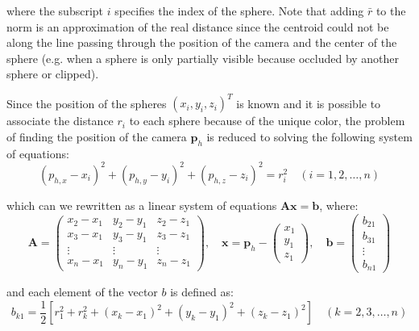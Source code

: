 \documentclass[a4paper]{article}
\begin{document}
\noindent where the subscript $i$ specifies the index of the
sphere. Note that adding $\bar{r}$ to the norm is an
approximation of the real distance since the centroid could
not be along the line passing through the position of the
camera and the center of the sphere (e.g. when a sphere is
only partially visible because occluded by another sphere or
clipped).

Since the position of the spheres $(x_i, y_i, z_i)^T$ is known
and it is possible
to associate the distance $r_i$ to each sphere because of the
unique color, the problem of finding the position of the
camera $\bm{p}_h$ is reduced to solving the following system of equations:
\begin{equation}
    (p_{h,x} - x_i)^2 + (p_{h,y} - y_i)^2 + (p_{h,z} - z_i)^2 = r_i^2 \quad (i = 1, 2, \dots, n)
\end{equation}

\noindent which can we rewritten as a linear system of equations
$\bm{Ax} = \bm{b}$, where:
\begin{equation}
    \bm{A} = \begin{pmatrix}
            x_2 - x_1 & y_2 - y_1 & z_2 - z_1 \\
            x_3 - x_1 & y_3 - y_1 & z_3 - z_1 \\
            \vdots & \vdots & \vdots \\
            x_n - x_1 & y_n - y_1 & z_n - z_1
        \end{pmatrix}, \quad
    \bm{x} =
        \bm{p}_h -
        \begin{pmatrix}
            x_1 \\
            y_1 \\
            z_1
        \end{pmatrix}, \quad
    \bm{b} = \begin{pmatrix}
            b_{21} \\
            b_{31} \\
            \vdots \\
            b_{n1}
        \end{pmatrix}
\end{equation}

\noindent and each element of the vector $b$ is defined as:
\begin{equation}
    b_{k1} = \frac{1}{2}\left[ r_1^2 + r_k^2 + (x_k - x_1)^2 + (y_k - y_1)^2 + (z_k - z_1)^2 \right] \quad (k = 2, 3, \dots, n)
\end{equation}
\end{document}
